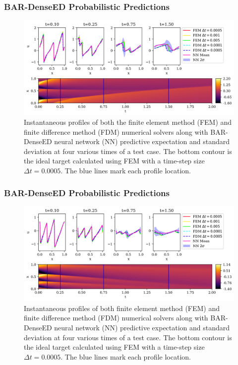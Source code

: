 \documentclass{beamer}
\theoremstyle{remark}
\begin{document}
\begin{frame}
\frametitle{BAR-DenseED Probabilistic Predictions}

\begin{figure}[H]
    \centering
    \includegraphics[width=\textwidth]{Fig14.png}
    \caption{Instantaneous profiles of both the finite element method (FEM) and finite difference method (FDM) numerical solvers along with BAR-DenseED neural network (NN) predictive expectation and standard deviation at four various times of a test case.
    The bottom contour is the ideal target calculated using FEM with a time-step size $\Delta t =0.0005$.
    The blue lines mark each profile location.}
    \label{fig:burgers1D-profile1}
\end{figure}
\end{frame}


\begin{frame}
\frametitle{BAR-DenseED Probabilistic Predictions}
\begin{figure}[H]
    \centering
    \includegraphics[width=\textwidth]{Fig15.png}
    \caption{Instantaneous profiles of both finite element method (FEM) and finite difference method (FDM) numerical solvers along with BAR-DenseED neural network (NN) predictive expectation and standard deviation at four various times of a test case.
    The bottom contour is the ideal target calculated using FEM with a time-step size $\Delta t =0.0005$.
    The blue lines mark each profile location.}
    \label{fig:burgers1D-profile2}
\end{figure}
\end{frame}
\end{document}
